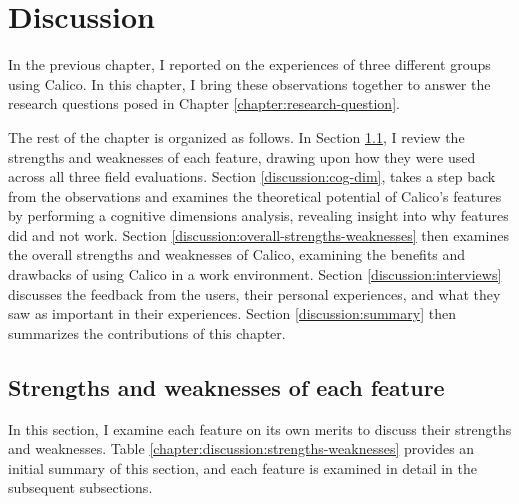 \documentclass[12pt,fleqn]{ucithesis}
\begin{document}
%
%
%
 \newpage 
 \newpage \chapter{Discussion}
\label{chapter:discussion}

In the previous chapter, I reported on the experiences of three different groups using Calico. In this chapter, I bring these observations together to answer the research questions posed in Chapter \ref{chapter:research-question}.

The rest of the chapter is organized as follows. In Section \ref{discussion:strengths-and-weaknesses}, I review the strengths and weaknesses of each feature, drawing upon how they were used across all three field evaluations. Section \ref{discussion:cog-dim}, takes a step back from the observations and examines the theoretical potential of Calico's features by performing a cognitive dimensions analysis, revealing insight into why features did and not work. Section \ref{discussion:overall-strengths-weaknesses} then examines the overall strengths and weaknesses of Calico, examining the benefits and drawbacks of using Calico in a work environment. Section \ref{discussion:interviews} discusses the feedback from the users, their personal experiences, and what they saw as important in their experiences. Section \ref{discussion:summary} then summarizes the contributions of this chapter.

\section{Strengths and weaknesses of each feature}
\label{discussion:strengths-and-weaknesses}

In this section, I examine each feature on its own merits to discuss their strengths and weaknesses. Table \ref{chapter:discussion:strengths-weaknesses} provides an initial summary of this section, and each feature is examined in detail in the subsequent subsections.
\end{document}
